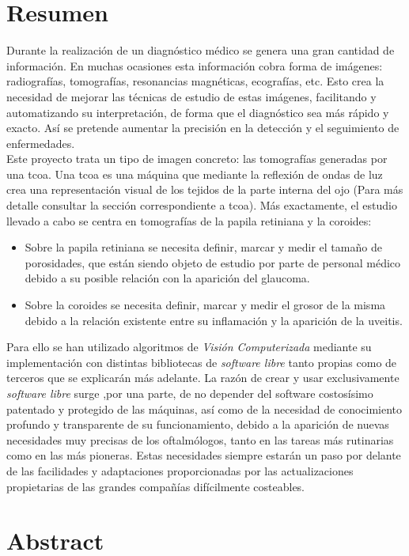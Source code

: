 \section*{Resumen}
Durante la realización de un diagnóstico médico se genera una gran
cantidad de información. En muchas ocasiones esta información cobra
forma de imágenes: radiografías, tomografías, resonancias magnéticas,
ecografías, etc. Esto crea la necesidad de mejorar las técnicas de
estudio de estas imágenes, facilitando y automatizando su
interpretación, de forma que el diagnóstico sea más rápido y
exacto. Así se pretende
aumentar la precisión en la detección y el seguimiento de enfermedades.\\
Este proyecto trata un tipo de imagen concreto: las tomografías
generadas por una \gls{tcoa}. Una \gls{tcoa} es una máquina que
mediante la reflexión de ondas de luz crea una representación visual
de los tejidos de la parte interna del ojo (Para más detalle consultar
la sección correspondiente a \gls{tcoa}). Más exactamente, el estudio
llevado a cabo se centra en tomografías de la papila retiniana y la
coroides:
\begin{itemize}
\item Sobre la papila retiniana se necesita definir, marcar y medir el
  tamaño de porosidades, que están siendo objeto de estudio por parte
  de personal médico debido a su posible relación con la aparición del
  glaucoma.
\item Sobre la coroides se necesita definir, marcar y medir el grosor
  de la misma debido a la relación existente entre su inflamación y la
  aparición de la uveitis.
\end{itemize}
Para ello se han utilizado algoritmos de \emph{Visión Computerizada}
mediante su implementación con distintas bibliotecas de \emph{software
  libre} tanto propias como de terceros que se explicarán más
adelante. La razón de crear y usar exclusivamente \emph{software libre}
surge ,por una parte, de no depender del
software costosísimo patentado y protegido de las máquinas, así como de la
necesidad de conocimiento profundo y transparente de su funcionamiento,
debido a la aparición de nuevas necesidades muy precisas de los
oftalmólogos, tanto en las tareas más rutinarias como en las más
pioneras. Estas necesidades siempre estarán un paso por delante de las
facilidades y adaptaciones proporcionadas por las actualizaciones
propietarias de las grandes compañías difícilmente costeables.
\newpage
\section*{Abstract}

